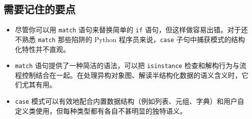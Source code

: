 \subsection{需要记住的要点}

\begin{itemize}
\item 尽管你可以用 \verb|match| 语句来替换简单的 \verb|if| 语句，但这样做容易出错。对于还不熟悉 \verb|match| 那些陷阱的 Python 程序员来说，\verb|case| 子句中捕获模式的结构化特性并不直观。
\item \verb|match| 语句提供了一种简洁的语法，可以把 \verb|isinstance| 检查和解构行为与流程控制结合在一起。在处理异构对象图、解读半结构化数据的语义含义时，它们尤其有用。
\item \verb|case| 模式可以有效地配合内置数据结构（例如列表、元组、字典）和用户自定义类使用，但每种类型都有各自不甚明显的独特语义。
\end{itemize}
